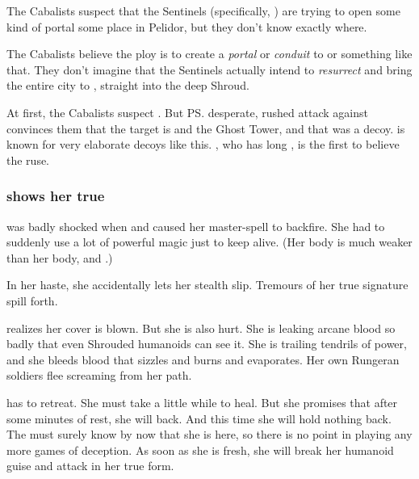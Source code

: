 The Cabalists suspect that the Sentinels (specifically, \Secherdamon) are trying to open some kind of portal some place in Pelidor, but they don't know exactly where. 

The Cabalists believe the ploy is to create a \emph{portal} or \emph{conduit} to \Nithdornazsh{} or something like that. 
They don't imagine that the Sentinels actually intend to \emph{resurrect} \Nithdornazsh{} and bring the entire city to \Azmith, straight into the deep Shroud. 

At first, the Cabalists suspect \Malcur. 
But \ps{\Takestsha} desperate, rushed attack against \Forclin{} convinces them that the target is \Forclin{} and the Ghost Tower, and that \Malcur was a decoy. 
\Secherdamon{} is known for very elaborate decoys like this. 
\Achsah, who has long , is the first to believe the \Forclin{} ruse. 





\subsubsection{\Nzessuacrith shows her true \colours}
\Takestsha was badly shocked when  and caused her \quo{\EreshKali} master-spell to backfire. 
She had to suddenly use a lot of powerful magic just to keep alive. 
(Her \human body is much weaker than her \draconian body, and .) 

In her haste, she accidentally lets her stealth slip.
Tremours of her true \vertex signature spill forth. 

\Takestsha realizes her cover is blown. 
But she is also hurt. 
She is leaking arcane blood so badly that even Shrouded humanoids can see it.
She is trailing tendrils of power, and she bleeds blood that sizzles and burns and evaporates. 
Her own Rungeran soldiers flee screaming from her path.

\Takestsha has to retreat. 
She must take a little while to heal. 
But she promises that after some minutes of rest, she will back.
And this time she will hold nothing back.
The \resphain must surely know by now that she is here, so there is no point in playing any more games of deception.
As soon as she is fresh, she will break her humanoid guise and attack in her true form. 

